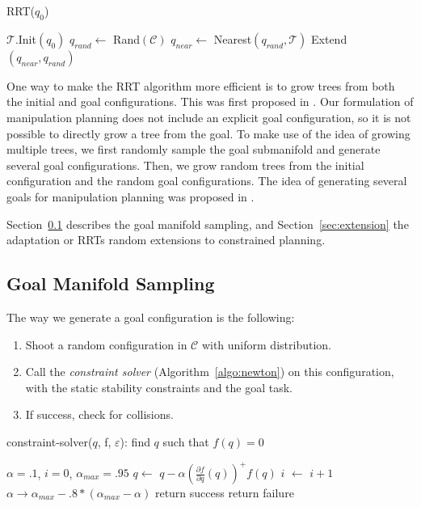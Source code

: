 \documentclass{article}
\begin{document}
\begin{algorithm}
\caption{RRT($q_0$)}
\label{algRRT}
\begin{algorithmic}
\STATE $\mathcal{T}.$Init$(q_0)$
\STATE $q_{rand} \leftarrow $ Rand$(\mathcal{C})$
\STATE $q_{near} \leftarrow $ Nearest$(q_{rand},\mathcal{T})$
\STATE Extend$(q_{near},q_{rand})$
\ENDFOR

\end{algorithmic}
\end{algorithm}

One way to make the RRT algorithm more efficient is to grow trees from both the initial
and  goal configurations. This was first proposed in 
\cite{kuffner00rrtconnect}. Our formulation of manipulation planning does
not include an explicit goal configuration, so it is not possible to directly grow
a tree from the goal. To make use of the idea of growing multiple trees, we first
randomly sample the goal submanifold and generate several goal configurations. Then, 
we grow random
trees from the initial configuration and the random goal configurations. The idea of
generating several goals for manipulation planning was proposed in \cite{diankov2008bpc}.

Section~\ref{sec:goal-sampling}  describes the goal manifold sampling, and 
Section~\ref{sec:extension} the adaptation or RRTs random extensions to constrained planning.

\subsection{Goal Manifold Sampling}
\label{sec:goal-sampling}

The way we generate a goal configuration is the following:
\begin{enumerate}
\item Shoot a random configuration in $\mathcal{C}$ with uniform distribution.
\item Call the \textit{constraint solver} (Algorithm~\ref{algo:newton}) on this configuration, with the static
  stability constraints and the goal task.
\item If success, check for collisions.
\end{enumerate}

\begin{algorithm}
\caption{constraint-solver($q$, f, $\varepsilon$): find $q$ such that $f(q) = 0$}
\label{algo:newton}
\begin{algorithmic}
\STATE $\alpha=.1$, $i=0$, $\alpha_{max} = .95$
\STATE $q \leftarrow$ $q - \alpha \left(\frac{\partial f}{\partial q}(q)\right)^{+} f(q)$
\STATE $i$ $\leftarrow$ $i+1$
\STATE $\alpha \rightarrow \alpha_{max} - .8*(\alpha_{max} - \alpha)$
\ENDWHILE
{}
\STATE return success
\ELSE
\STATE return failure
\ENDIF
\end{algorithmic}
\end{algorithm}
\end{document}
